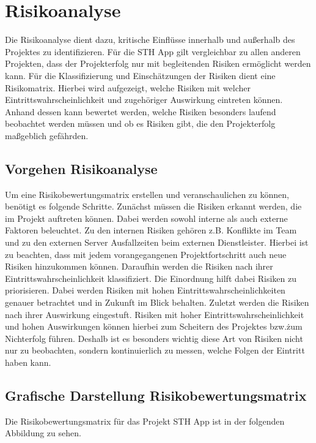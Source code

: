 \chapter{Risikoanalyse}

Die Risikoanalyse dient dazu, kritische Einflüsse innerhalb und außerhalb des Projektes zu identifizieren.
Für die STH App gilt vergleichbar zu allen anderen Projekten, dass der Projekterfolg nur mit begleitenden Risiken ermöglicht werden kann.
Für die Klassifizierung und Einschätzungen der Risiken dient eine Risikomatrix. Hierbei wird aufgezeigt, welche Risiken mit welcher Eintrittswahrscheinlichkeit und zugehöriger Auswirkung eintreten können.
Anhand dessen kann bewertet werden, welche Risiken besonders laufend beobachtet werden müssen und ob es Risiken gibt, die den Projekterfolg maßgeblich gefährden.

\section{Vorgehen Risikoanalyse}
Um eine Risikobewertungsmatrix erstellen und veranschaulichen zu können, benötigt es folgende Schritte.
Zunächst müssen die Risiken erkannt werden, die im Projekt auftreten können.
Dabei werden sowohl interne als auch externe Faktoren beleuchtet.
Zu den internen Risiken gehören z.B. Konflikte im Team und zu den externen Server Ausfallzeiten beim externen Dienstleister.
Hierbei ist zu beachten, dass mit jedem vorangegangenen Projektfortschritt auch neue Risiken hinzukommen können.
Daraufhin werden die Risiken nach ihrer Eintrittswahrscheinlichkeit klassifiziert.
Die Einordnung hilft dabei Risiken zu priorisieren.
Dabei werden Risiken mit hohen Eintrittswahrscheinlichkeiten genauer betrachtet und in Zukunft im Blick behalten.
Zuletzt werden die Risiken nach ihrer Auswirkung eingestuft.
Risiken mit hoher Eintrittswahrscheinlichkeit und hohen Auswirkungen können hierbei zum Scheitern des Projektes bzw.\. zum Nichterfolg führen.
Deshalb ist es besonders wichtig diese Art von Risiken nicht nur zu beobachten, sondern kontinuierlich zu messen, welche Folgen der Eintritt haben kann.

\section{Grafische Darstellung Risikobewertungsmatrix}
Die Risikobewertungsmatrix für das Projekt STH App ist in der folgenden Abbildung zu sehen.

